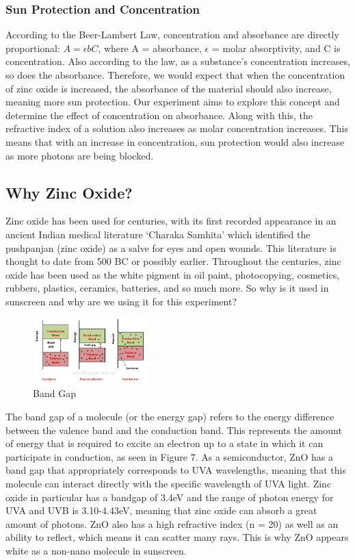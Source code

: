 \documentclass{article}
\begin{document}
\subsubsection{Sun Protection and Concentration}
According to the Beer-Lambert Law, concentration and absorbance are directly proportional: $A = \epsilon bC$, where A = absorbance, $\epsilon$ = molar absorptivity, and C is concentration. Also according to the law, as a substance’s concentration increases, so does the absorbance. Therefore, we would expect that when the concentration of zinc oxide is increased, the absorbance of the material should also increase, meaning more sun protection. Our experiment aims to explore this concept and determine the effect of concentration on absorbance. Along with this, the refractive index of a solution also increases as molar concentration increases. This means that with an increase in concentration, sun protection would also increase as more photons are being blocked.

\subsection{Why Zinc Oxide?}
Zinc oxide has been used for centuries, with its first recorded appearance in an ancient Indian medical literature ‘Charaka Samhita’ which identified the pushpanjan (zinc oxide) as a salve for eyes and open wounds. This literature is thought to date from 500 BC or possibly earlier. Throughout the centuries, zinc oxide has been used as the white pigment in oil paint, photocopying, cosmetics, rubbers, plastics, ceramics, batteries, and so much more. \cite{grabenhofer_inside_2022} So why is it used in sunscreen and why are we using it for this experiment?

\begin{figure}
  \centering
  \caption{Band Gap \cite{noauthor_semiconductor_nodate}}
  \includegraphics[width=0.4\textwidth]{bandgap.png}
\end{figure}
The band gap of a molecule (or the energy gap) refers to the energy difference between the valence band and the conduction band. This represents the amount of energy that is required to excite an electron up to a state in which it can participate in conduction, as seen in Figure 7. As a semiconductor, ZnO has a band gap that appropriately corresponds to UVA wavelengths, meaning that this molecule can interact directly with the specific wavelength of UVA light. Zinc oxide in particular has a bandgap of 3.4eV and the range of photon energy for UVA and UVB is 3.10-4.43eV, meaning that zinc oxide can absorb a great amount of photons. ZnO also has a high refractive index (n = 20) as well as an ability to reflect, which means it can scatter many rays. This is why ZnO appears white as a non-nano molecule in sunscreen.
\end{document}
